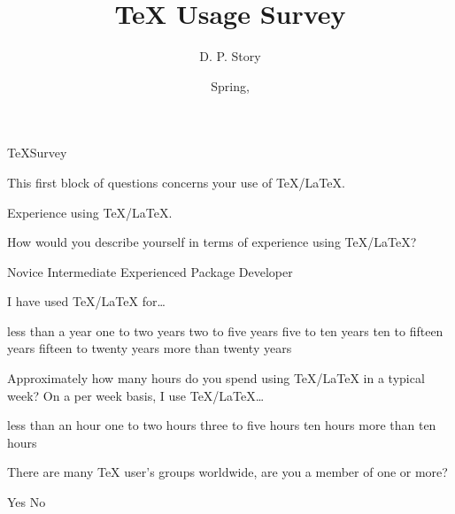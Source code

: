 \documentclass{article}
\title[TS]{\texorpdfstring{\TeX}{\textbackslash TeX} Usage Survey}
\author{D. P. Story}
\date{Spring, \the\year}
\begin{document}
\maketitle

\begin{exam}{TeXSurvey}

\begin{instructions}
This first block of questions concerns your use of {\TeX/\LaTeX}.
\end{instructions}

\begin{problem*}
Experience using \TeX/\LaTeX.
\begin{parts}
\item How would you describe yourself in terms of experience using \TeX/\LaTeX?
\begin{answers}{4}
\rowsep{1bp}
\bChoices
     Novice\eAns
     Intermediate\eAns
     Experienced\eAns
     Package Developer\eAns
\eChoices
\end{answers}

\item I have used \TeX/\LaTeX{} for\dots
\begin{answers}{3}
\rowsep{1bp}
\bChoices
     less than a year\eAns
     one to two years\eAns
     two to five years\eAns
     five to ten years\eAns
     ten to fifteen years\eAns
     fifteen to twenty years\eAns
     more than twenty years\eAns
\eChoices
\end{answers}

\end{parts}
\end{problem*}

\begin{problem}
Approximately how many hours do you spend using \TeX/\LaTeX{} in a typical week?
On a per week basis, I use \TeX/\LaTeX\dots
\begin{answers}{4}
\rowsep{1bp}
\bChoices
     less than an hour\eAns
     one to two hours\eAns
     three to five hours\eAns
     ten hours\eAns
     more than ten hours\eAns
\eChoices
\end{answers}
\end{problem}

\begin{problem}
There are many {\TeX} user's groups worldwide, are you a member of one or more?
\begin{answers}{4}
\bChoices
     Yes\eAns
     No\eAns
\eChoices
\end{answers}
\end{problem}


\end{exam}
\end{document}
